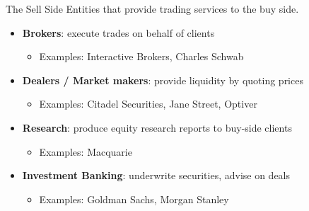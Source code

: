 \begin{frame}{The Sell Side}
  Entities that provide trading services to the buy side.

  \vspace{0.3cm}
  \begin{itemize}
    \item \textbf{Brokers}: execute trades on behalf of clients
    \begin{itemize}
      \item Examples: Interactive Brokers, Charles Schwab
    \end{itemize}
    \item \textbf{Dealers / Market makers}: provide liquidity by quoting prices
    \begin{itemize}
      \item Examples: Citadel Securities, Jane Street, Optiver
    \end{itemize}
    \item \textbf{Research}: produce equity research reports to buy-side clients
    \begin{itemize}
      \item Examples: Macquarie
    \end{itemize}
    \item \textbf{Investment Banking}: underwrite securities, advise on deals
    \begin{itemize}
      \item Examples: Goldman Sachs, Morgan Stanley
    \end{itemize}
  \end{itemize}
\end{frame}
